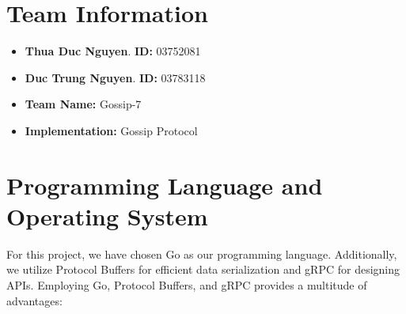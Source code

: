 \section{Team Information}

\begin{itemize}
    \item \textbf{Thua Duc Nguyen}. \textbf{ID:} 03752081
    \item \textbf{Duc Trung Nguyen}. \textbf{ID:} 03783118
    \item \textbf{Team Name:} Gossip-7
    \item \textbf{Implementation:} Gossip Protocol
\end{itemize}

\section{Programming Language and Operating System}

For this project, we have chosen Go as our programming language. Additionally, we utilize Protocol Buffers for efficient data serialization and gRPC for designing APIs. Employing Go, Protocol Buffers, and gRPC provides a multitude of advantages:

